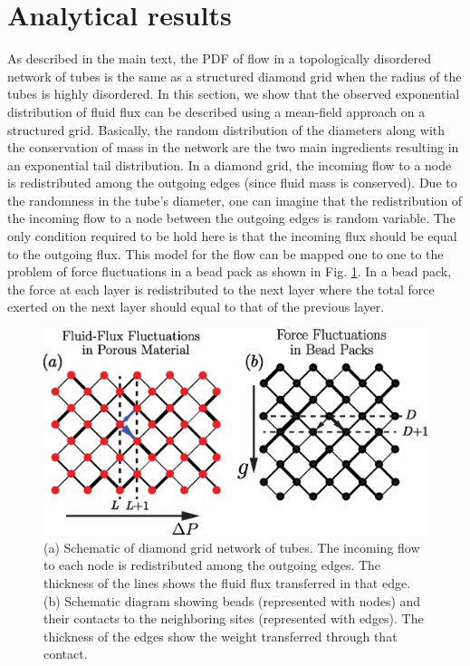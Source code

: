 \documentclass[%
 amsmath,amssymb,
prstper,
]{revtex4-2}
\begin{document}
\section{Analytical results}
%
\label{sec:analytical}
%
As described in the main text, the PDF of flow in a topologically disordered network of tubes is the same as a structured diamond grid when the radius of the tubes is highly disordered. In this section, we show that the observed exponential distribution of fluid flux can be described using a mean-field approach on a structured grid. Basically, the random distribution of the diameters along with the conservation of mass in the network are the two main ingredients resulting in an exponential tail distribution. In a diamond grid, the incoming flow to a node is redistributed among the outgoing edges (since fluid mass is conserved). Due to the randomness in the tube's diameter, one can imagine that the redistribution of the incoming flow to a node between the outgoing edges is random variable. The only condition required to be hold here is that the incoming flux should be equal to the outgoing flux. This model for the flow can be mapped one to one to the problem of force fluctuations in a bead pack \cite{liu1995force,coppersmith1996model,alim2017local} as shown in Fig. \ref{grid-result}. In a bead pack, the force at each layer is redistributed to the next layer where the total force exerted on the next layer should equal to that of the previous layer. 
%
\begin{figure}[h]
  \centering
  \includegraphics[width=.75\textwidth]{./Figs/grid-analytica.eps}
  \caption{(a) Schematic of diamond grid network of tubes. The incoming flow to each node is redistributed among the outgoing edges. The thickness of the lines shows the fluid flux transferred in that edge. (b) Schematic diagram showing beads (represented with nodes) and their contacts to the neighboring sites (represented with edges). The thickness of the edges show the weight transferred through that contact.} \label{grid-result}
\end{figure}
\end{document}

